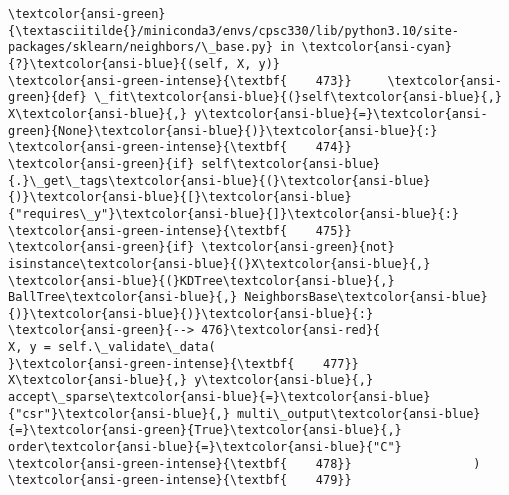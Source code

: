 \documentclass[11pt]{article}
\begin{document}
\begin{Verbatim}[commandchars=\\\{\}, frame=single, framerule=2mm, rulecolor=\color{outerrorbackground}]
\textcolor{ansi-green}{\textasciitilde{}/miniconda3/envs/cpsc330/lib/python3.10/site-packages/sklearn/neighbors/\_base.py} in \textcolor{ansi-cyan}{?}\textcolor{ansi-blue}{(self, X, y)}
\textcolor{ansi-green-intense}{\textbf{    473}}     \textcolor{ansi-green}{def} \_fit\textcolor{ansi-blue}{(}self\textcolor{ansi-blue}{,} X\textcolor{ansi-blue}{,} y\textcolor{ansi-blue}{=}\textcolor{ansi-green}{None}\textcolor{ansi-blue}{)}\textcolor{ansi-blue}{:}
\textcolor{ansi-green-intense}{\textbf{    474}}         \textcolor{ansi-green}{if} self\textcolor{ansi-blue}{.}\_get\_tags\textcolor{ansi-blue}{(}\textcolor{ansi-blue}{)}\textcolor{ansi-blue}{[}\textcolor{ansi-blue}{"requires\_y"}\textcolor{ansi-blue}{]}\textcolor{ansi-blue}{:}
\textcolor{ansi-green-intense}{\textbf{    475}}             \textcolor{ansi-green}{if} \textcolor{ansi-green}{not} isinstance\textcolor{ansi-blue}{(}X\textcolor{ansi-blue}{,} \textcolor{ansi-blue}{(}KDTree\textcolor{ansi-blue}{,} BallTree\textcolor{ansi-blue}{,} NeighborsBase\textcolor{ansi-blue}{)}\textcolor{ansi-blue}{)}\textcolor{ansi-blue}{:}
\textcolor{ansi-green}{--> 476}\textcolor{ansi-red}{                 X, y = self.\_validate\_data(
}\textcolor{ansi-green-intense}{\textbf{    477}}                     X\textcolor{ansi-blue}{,} y\textcolor{ansi-blue}{,} accept\_sparse\textcolor{ansi-blue}{=}\textcolor{ansi-blue}{"csr"}\textcolor{ansi-blue}{,} multi\_output\textcolor{ansi-blue}{=}\textcolor{ansi-green}{True}\textcolor{ansi-blue}{,} order\textcolor{ansi-blue}{=}\textcolor{ansi-blue}{"C"}
\textcolor{ansi-green-intense}{\textbf{    478}}                 )
\textcolor{ansi-green-intense}{\textbf{    479}} 


\end{Verbatim}
\end{document}
